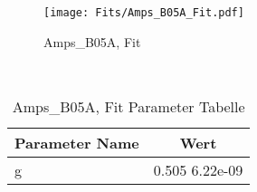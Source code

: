 \begin{figure}[ht] 
 	\centering 
 	\texttt{[image: Fits/Amps\_B05A\_Fit.pdf]} 
	\caption{Amps_B05A, Fit} 
 	\label{fig:Amps_B05A, Fit} 
\end{figure}
 \\ 
\begin{table}[ht] 
\centering 
\caption{Amps_B05A, Fit Parameter Tabelle} 
\label{tab:my-table}
\begin{tabular}{|l|c|}
\hline
Parameter Name	&	Wert \\ \hline
g	&	 0.505 \pm  6.22e-09\\ \hline
\end{tabular} 
\end{table}